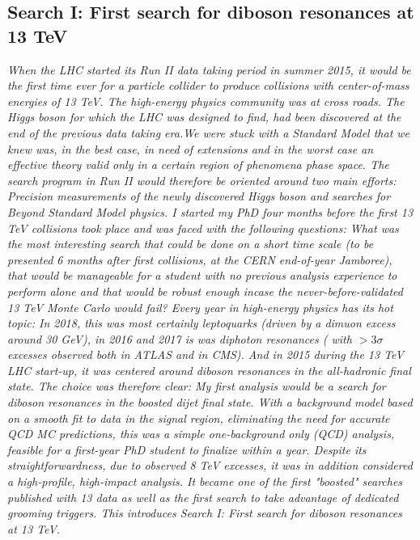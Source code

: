 \vspace*{\fill}
\begin{centering}
\section{Search I: First search for diboson resonances at 13 TeV}
\label{searchI}
\textit{
When the LHC started its Run II data taking period in summer 2015, it would be the first time ever for a particle collider to produce collisions with center-of-mass energies of 13 TeV. The high-energy physics community was at cross roads. The Higgs boson for which the LHC was designed to find, had been discovered at the end of the previous data taking era.We were stuck with a Standard Model that we knew was, in the best case, in need of extensions and in the worst case an effective theory valid only in a certain region of phenomena phase space. The search program in Run II would therefore be oriented around two main efforts: Precision measurements of the newly discovered Higgs boson and searches for Beyond Standard Model physics.
\newline
\newline
I started my PhD four months before the first 13 TeV collisions took place and was faced with the following questions:
What was the most interesting search that could be done on a short time scale (to be presented 6 months after first collisions, at the CERN end-of-year Jamboree), that would be manageable for a student with no previous analysis experience to perform alone and that would be robust enough incase the never-before-validated 13 TeV Monte Carlo would fail? \newline
\newline
Every year in high-energy physics has its hot topic: In 2018, this was most certainly leptoquarks (driven by a dimuon excess around 30 GeV), in 2016 and 2017 is was diphoton resonances ( with  $>3\sigma$ excesses observed both in ATLAS and in CMS). And in 2015 during the 13 TeV LHC start-up, it was centered around diboson resonances in the all-hadronic final state. The choice was therefore clear: My first analysis would be a search for diboson resonances in the boosted dijet final state. With a background model based on a smooth fit to data in the signal region, eliminating the need for accurate QCD MC predictions, this was a simple one-background only (QCD) analysis, feasible for a first-year PhD student to finalize within a year. Despite its straightforwardness, due to observed 8 TeV excesses, it was in addition considered a high-profile, high-impact analysis.
\newline
\newline
It became one of the first "boosted" searches published with 13 \TeV data as well as the first search to take advantage of dedicated grooming triggers. This introduces Search I: First search for diboson resonances at 13 TeV.
}
\end{centering}
